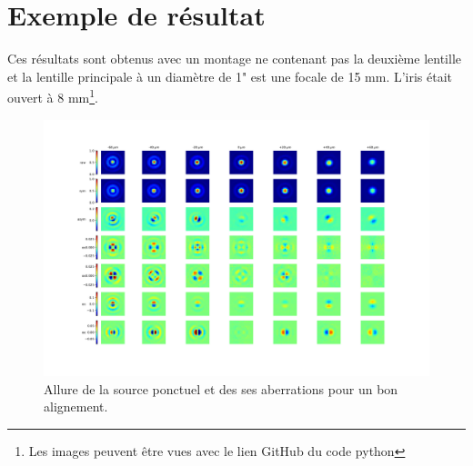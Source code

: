 \documentclass[11pt,letterpaper]{article}
\begin{document}
\section{Exemple de résultat}
Ces résultats sont obtenus avec un montage ne contenant pas la deuxième lentille et la lentille principale à un diamètre de 1" est une focale de 15 mm. L'iris était ouvert à 8 mm\footnote{Les images peuvent être vues avec le lien GitHub du code python}.
\begin{figure}[H]
    \centering
    \includegraphics[scale=0.3]{test23_psm.jpg}
    \caption{Allure de la source ponctuel et des ses aberrations pour un bon alignement.}
    \label{test23}
\end{figure}
\end{document}

